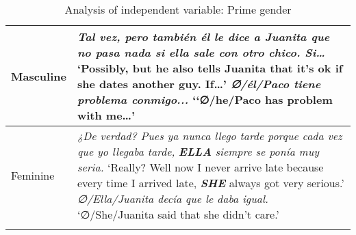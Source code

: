 \documentclass[output=paper]{langscibook}
\begin{document}
\begin{table}
\caption{Analysis of independent variable: Prime gender}
\begin{tabularx}{\textwidth}{lQ}
\lsptoprule
 Masculine & \textit{Tal vez, pero también él le dice a Juanita que no pasa nada si ella sale con otro chico. Si…}\newline
 {‘Possibly, but he also tells Juanita that it’s ok if she dates another guy. If…’}\newline
 {\itshape ∅/él/Paco tiene problema conmigo...}\newline
 {‘‘∅/he/Paco has problem with me…’}\\
\midrule
 {Feminine} & {\textit{¿De verdad? Pues ya nunca llego tarde porque cada vez que yo llegaba tarde,} }{\textbf{\textit{ELLA}}}{ \textit{siempre se ponía muy seria.} }\newline
{‘Really? Well now I never arrive late because every time I arrived late,} {\textbf{\textit{SHE}}} {always got very serious.’}\newline
 {\itshape ∅/Ella/Juanita decía que le daba igual.}\newline
 {‘∅/She/Juanita said that she didn’t care.’}\\
\lspbottomrule
\end{tabularx}
\label{tab:geeslin:6}
\end{table}
\end{document}
